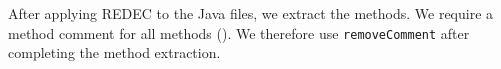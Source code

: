 \documentclass[%
class=scrreprt,
chapterprefix=false,%
open=right,%
twoside=true,%
paper=a4,%
logofile={Logo\_zentral\_farbig\_EN.png},%
thesistype=master,%
UKenglish,%
]{se2thesis}
\theoremstyle{definition}
\newcommand{\rdh}{REDEC\xspace}
\newcommand{\RDMs}{Readability Decreasing Modifications\xspace}
\def\checkmark{\tikz\fill[scale=0.4](0,.35) -- (.25,0) -- (1,.7) -- (.25,.15) -- cycle;}
\begin{document}
	
	After applying \rdh to the Java files, we extract the methods. We require a method comment for all methods (). We therefore use \texttt{removeComment} after completing the method extraction.
	
\end{document}
